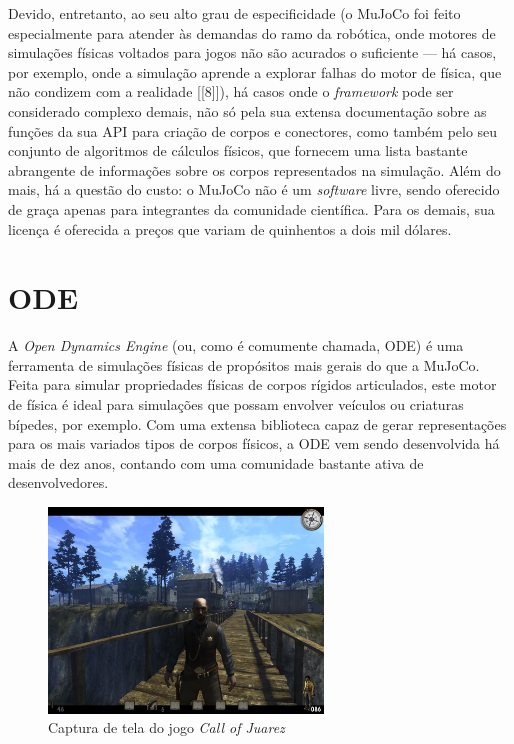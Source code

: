 \documentclass[cic,tc]{iiufrgs}
\begin{document}
Devido, entretanto, ao seu alto grau de especificidade (o MuJoCo foi feito
especialmente para atender às demandas do ramo da robótica, onde motores de
simulações físicas voltados para jogos não são acurados o suficiente --- há
casos, por exemplo, onde a simulação aprende a explorar falhas do motor de
física, que não condizem com a realidade [[8]]), há casos
onde o \textit{framework} pode ser considerado complexo demais, não só pela sua
extensa documentação sobre as funções da sua API para criação de corpos e
conectores, como também pelo seu conjunto de algoritmos de cálculos físicos, que
fornecem uma lista bastante abrangente de informações sobre os corpos
representados na simulação. Além do mais, há a questão do custo: o MuJoCo não
é um \textit{software} livre, sendo oferecido de graça apenas para integrantes
da comunidade científica. Para os demais, sua licença é oferecida a preços que
variam de quinhentos a dois mil dólares.

\section{ODE}
\label{ode}
%

A \textit{Open Dynamics Engine} (ou, como é comumente chamada, ODE) é uma
ferramenta de simulações físicas de propósitos mais gerais do que a MuJoCo.
Feita para simular propriedades físicas de corpos rígidos articulados, este
motor de física é ideal para simulações que possam envolver veículos ou
criaturas bípedes, por exemplo. Com uma extensa biblioteca capaz de gerar
representações para os mais variados tipos de corpos físicos, a ODE vem sendo
desenvolvida há mais de dez anos, contando com uma comunidade bastante ativa de
desenvolvedores.



\begin{figure}
    \caption{Captura de tela do jogo \textit{Call of Juarez}}
    \begin{center}
      \includegraphics[width=0.65\textwidth]{call_of_juarez.png}
    \end{center}
    \label{fig:call_of_juarez}
\end{figure}
\end{document}
